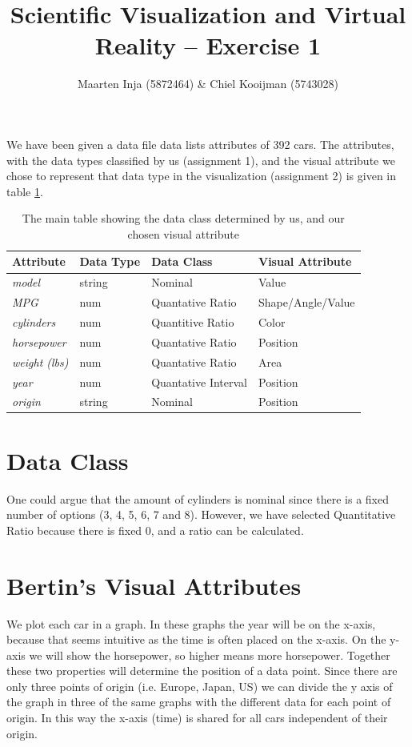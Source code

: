 \documentclass{article}[9pt]
\title{Scientific Visualization and Virtual Reality – Exercise 1}
\author{Maarten Inja (5872464) \& Chiel Kooijman (5743028)}
\begin{document}
\maketitle

\vspace{-0.5cm}

We have been given a data file data lists attributes of 392 cars. The
attributes, with the data types classified by us (assignment 1), and the visual
attribute we chose to represent that data type in the visualization (assignment
2) is given in table \ref{tab:mainTable}.

\begin{table}
    \begin{tabular}{l l | l l}
    \textbf{Attribute} & \textbf{Data Type} & \textbf{Data Class} & \textbf{Visual Attribute}\\
    \hline
    \textit{model} & string & Nominal       &  Value \\
    \textit{MPG} & num & Quantative Ratio   & Shape/Angle/Value \\
    \textit{cylinders} & num & Quantitive Ratio & Color \\
    \textit{horsepower} & num & Quantative Ratio & Position\\
    \textit{weight (lbs)} & num & Quantative Ratio & Area \\
    \textit{year} & num & Quantative Interval & Position \\
    \textit{origin} & string & Nominal & Position
    \end{tabular}
\caption{The main table showing the data class determined by us, and our chosen
visual attribute}
\label{tab:mainTable}
\end{table}

\vspace{-0.3cm}
\section{Data Class}
\vspace{-0.3cm}
One could argue that the amount of cylinders is
nominal since there is a fixed number of options (3, 4, 5, 6, 7 and 8). However,
we have selected Quantitative Ratio because there is fixed 0, and a ratio can be
calculated.

\vspace{-0.3cm}
\section{Bertin's Visual Attributes}
\vspace{-0.3cm}
We plot each car in a graph.
In these graphs the year will be on the x-axis, because that seems intuitive as the time
is often placed on the x-axis. On the y-axis we will show the horsepower, so
higher means more horsepower.
Together these two properties will determine the position of a data point.
Since there are only three points of origin (i.e. Europe, Japan, US) we can
divide the y axis of the graph in three of the same graphs with the different
data for each point of origin. In this way the x-axis (time) is shared for all
cars independent of their origin.
\end{document}
